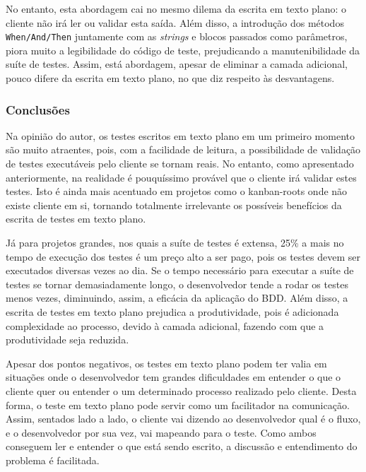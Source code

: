 No entanto, esta abordagem cai no mesmo dilema da escrita em texto plano: o cliente não irá ler ou validar esta saída. Além disso, a introdução dos métodos \texttt{When/And/Then} juntamente com as \textit{strings} e blocos passados como parâmetros, piora muito a legibilidade do código de teste, prejudicando a manutenibilidade da suíte de testes. Assim, está abordagem, apesar de eliminar a camada adicional, pouco difere da escrita em texto plano, no que diz respeito às desvantagens.


\subsubsection{Conclusões} %
\label{subsub:conclusoes_bdd}

Na opinião do autor, os testes escritos em texto plano em um primeiro momento são muito atraentes, pois, com a facilidade de leitura, a possibilidade de validação de testes executáveis pelo cliente se tornam reais. No entanto, como apresentado anteriormente, na realidade é pouquíssimo provável que o cliente irá validar estes testes. Isto é ainda mais acentuado em projetos como o kanban-roots onde não existe cliente em si, tornando totalmente irrelevante os possíveis benefícios da escrita de testes em texto plano.

Já para projetos grandes, nos quais a suíte de testes é extensa, 25\% a mais no tempo de execução dos testes é um preço alto a ser pago, pois os testes devem ser executados diversas vezes ao dia. Se o tempo necessário para executar a suíte de testes se tornar demasiadamente longo, o desenvolvedor tende a rodar os testes menos vezes, diminuindo, assim, a eficácia da aplicação do BDD. Além disso, a escrita de testes em texto plano prejudica a produtividade, pois é adicionada complexidade ao processo, devido à camada adicional, fazendo com que a produtividade seja reduzida.

Apesar dos pontos negativos, os testes em texto plano podem ter valia em situações onde o desenvolvedor tem grandes dificuldades em entender o que o cliente quer ou entender o um determinado processo realizado pelo cliente. Desta forma, o teste em texto plano pode servir como um facilitador na comunicação. Assim, sentados lado a lado, o cliente vai dizendo ao desenvolvedor qual é o fluxo, e o desenvolvedor por sua vez, vai mapeando para o teste. Como ambos conseguem ler e entender o que está sendo escrito, a discussão e entendimento do problema é facilitada.

